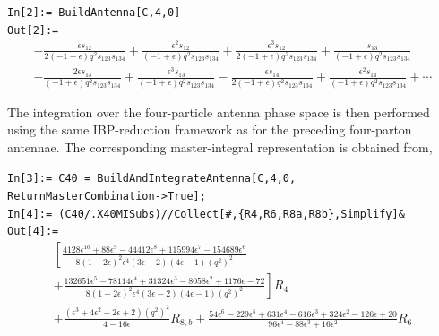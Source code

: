 \begin{mdframed}[backgroundcolor=gray!10, linewidth=0pt]
\texttt{In[2]:= BuildAntenna[C,4,0]}\\
\hfill
\texttt{Out[2]:=}
    \begin{equation*}
        \begin{gathered}
            -\frac{\epsilon s_{12}}{2(-1+\epsilon)q^2s_{123}s_{134}}+\frac{\epsilon^2s_{12}}{(-1+\epsilon)q^2s_{123}s_{134}}+\frac{\epsilon^3s_{12}}{2(-1+\epsilon)q^2s_{123}s_{134}}+\frac{s_{13}}{(-1+\epsilon)q^2s_{123}s_{134}}\\
            -\frac{2\epsilon s_{13}}{(-1+\epsilon)q^2s_{123}s_{134}}+\frac{\epsilon^3s_{13}}{(-1+\epsilon)q^2s_{123}s_{134}}-\frac{\epsilon s_{14}}{2(-1+\epsilon)q^2s_{123}s_{134}}+\frac{\epsilon^2s_{14}}{(-1+\epsilon)q^2s_{123}s_{134}}+\cdots
        \end{gathered}
    \end{equation*}
\end{mdframed}

The integration over the four-particle antenna phase space is then performed using the same
IBP-reduction framework as for the preceding four-parton antennae. The corresponding
master-integral representation is obtained from,

\begin{mdframed}[backgroundcolor=gray!10, linewidth=0pt]
\texttt{In[3]:= C40 = BuildAndIntegrateAntenna[C,4,0,\\ReturnMasterCombination->True];}\\
\texttt{In[4]:= (C40/.X40MISubs)//Collect[\#,\{R4,R6,R8a,R8b\},Simplify]\&}\\
\hfill
\texttt{Out[4]:=}
    \begin{equation*}
        \begin{gathered}
            \left[\frac{4128\epsilon^{10}+88\epsilon^9-44412\epsilon^8+115994\epsilon^7-154689\epsilon^6}{8(1-2\epsilon)^2\epsilon^4(3\epsilon-2)(4\epsilon-1)\left(q^2\right)^2}\right.\\
            \left.+\frac{132651\epsilon^5-78114\epsilon^4+31324\epsilon^3-8058\epsilon^2+1176\epsilon-72}{8(1-2\epsilon)^2\epsilon^4(3\epsilon-2)(4\epsilon-1)\left(q^2\right)^2}\right]R_4\\
            +\frac{\left(\epsilon^3+4\epsilon^2-2\epsilon+2\right)\left(q^2\right)^2}{4-16\epsilon}R_{8,b}
            +\frac{54\epsilon^6-229\epsilon^5+631\epsilon^4-616\epsilon^3+324\epsilon^2-126\epsilon+20}{96\epsilon^4-88\epsilon^3+16\epsilon^2}R_6
        \end{gathered}
    \end{equation*}
\end{mdframed}

